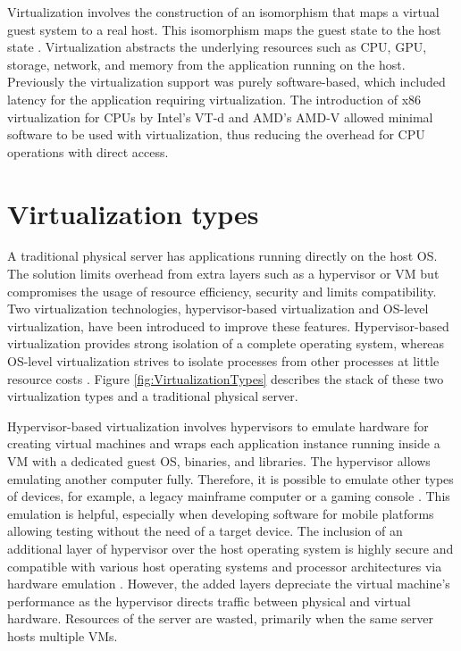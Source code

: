 Virtualization involves the construction of an isomorphism that maps a virtual guest system to a real host. This isomorphism maps the guest state to the host state \cite{Xing2012}. Virtualization abstracts the underlying resources such as CPU, GPU, storage, network, and memory from the application running on the host. Previously the virtualization support was purely software-based, which included latency for the application requiring virtualization. The introduction of x86 virtualization for CPUs by Intel's VT-d and AMD's AMD-V allowed minimal software to be used with virtualization, thus reducing the overhead for CPU operations with direct access.

\section{Virtualization types}

A traditional physical server has applications running directly on the host OS. The solution limits overhead from extra layers such as a hypervisor or VM but compromises the usage of resource efficiency, security and limits compatibility. Two virtualization technologies, hypervisor-based virtualization and OS-level virtualization, have been introduced to improve these features. Hypervisor-based virtualization provides strong isolation of a complete operating system, whereas OS-level virtualization strives to isolate processes from other processes at little resource costs \cite{Eder2016}. Figure \ref{fig:VirtualizationTypes} describes the stack of these two virtualization types and a traditional physical server.

Hypervisor-based virtualization involves hypervisors to emulate hardware for creating virtual machines and wraps each application instance running inside a VM with a dedicated guest OS, binaries, and libraries. The hypervisor allows emulating another computer fully. Therefore, it is possible to emulate other types of devices, for example, a legacy mainframe computer or a gaming console \cite{Eder2016}. This emulation is helpful, especially when developing software for mobile platforms allowing testing without the need of a target device. The inclusion of an additional layer of hypervisor over the host operating system is highly secure and compatible with various host operating systems and processor architectures via hardware emulation \cite{Lingayat2018}. However, the added layers depreciate the virtual machine's performance as the hypervisor directs traffic between physical and virtual hardware. Resources of the server are wasted, primarily when the same server hosts multiple VMs.

